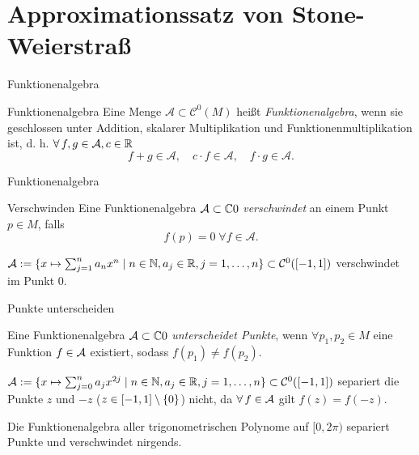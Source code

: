 \section{Approximationssatz von Stone-Weierstraß}

\begin{frame}{Funktionenalgebra}
    \begin{defi*}{Funktionenalgebra}
        Eine Menge \( \mathcal{A} \subset \mathcal{C}^0(M) \) heißt 
        \textit{Funktionenalgebra}, wenn sie geschlossen unter Addition, 
        skalarer Multiplikation und Funktionenmultiplikation ist, 
        d. h. \( \forall f,g \in \A, c \in \mathbb{R} \)
        \[ f + g \in \mathcal{A}, \quad c \cdot f \in \mathcal{A}, \quad f \cdot g \in \mathcal{A}. \]
    \end{defi*}
\end{frame}

\begin{frame}{Funktionenalgebra}
    \begin{defi*}{Verschwinden}
        Eine Funktionenalgebra \(\mathcal{A} \subset \mathbb{C}0\) 
        \textit{verschwindet} an einem Punkt \(p \in M\), falls 
        \[ f(p) = 0 \;\forall f \in \mathcal{A}. \]
    \end{defi*}
    \begin{bsp}
        \( \mathcal{A} := \{ x \mapsto \sum_{j=1}^n a_n x^n \;|\; n\in \mathbb{N}, a_j \in \mathbb{R}, j = 1,\ldots, n \} \subset \mathcal{C}^0([-1,1]) \) 
        verschwindet im Punkt \(0\).
    \end{bsp}
\end{frame}

\begin{frame}{Punkte unterscheiden}
    \begin{defi*}
        Eine Funktionenalgebra \(\mathcal{A} \subset \mathbb{C}0\) \textit{unterscheidet Punkte}, 
        wenn \( \forall p_1, p_2 \in M \) eine Funktion \(f \in \mathcal{A}\) existiert, 
        sodass \( f(p_1) \neq f(p_2) \).
    \end{defi*}
    \begin{bsp}
        \( \mathcal{A} := \{ x \mapsto \sum_{j=0}^n a_{j} x^{2j} \;|\; n\in\mathbb{N}, a_j \in \mathbb{R}, j = 1,\ldots, n \} 
        \subset \mathcal{C}^0([-1,1]) \)
        separiert die Punkte \( z \) und \(-z\) (\(z \in [-1,1] \setminus \{0\} \)) nicht, da \( \forall f \in \A \) gilt 
        \( f(z) = f(-z) \).
    \end{bsp}
    \begin{bsp}
        Die Funktionenalgebra aller trigonometrischen Polynome auf \( [0,2\pi) \) 
        separiert Punkte und verschwindet nirgends.
    \end{bsp}
\end{frame}

